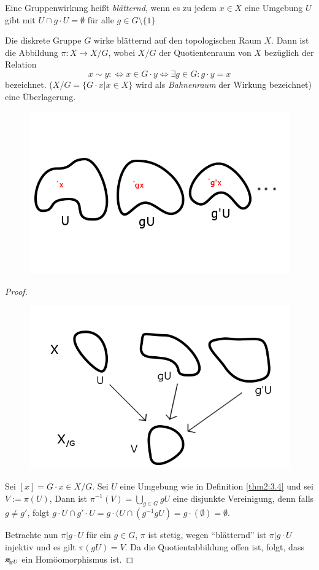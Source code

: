 \documentclass[a4paper,10pt]{scrartcl}
\begin{document}
\begin{df}\label{thm2:3.4}
 Eine Gruppenwirkung heißt \emph{blätternd}, wenn es zu jedem $x\in X$ eine Umgebung $U$ gibt mit $U\cap g\cdot U=\emptyset$ für alle $g\in G\setminus\{1\}$
\end{df}
\begin{lem}
 Die diskrete Gruppe $G$ wirke blätternd auf den topologischen Raum $X$. Dann ist die Abbildung $\pi: X\to X/G$, wobei $X/G$ der Quotientenraum von $X$ bezüglich der Relation
\[
 x\sim y :\iff x\in G\cdot y \iff \exists g\in G: g\cdot y=x
\]
bezeichnet. ($X/G=\{G\cdot x|x\in X\}$ wird als \emph{Bahnenraum} der Wirkung bezeichnet) eine Überlagerung.
\begin{figure}[H]
\centering
\includegraphics[scale=0.3]{fig75.png} 
\end{figure}

\end{lem}
\begin{proof}
\begin{figure}[H]
\centering
\includegraphics[scale=0.3]{fig76.png} 
\end{figure}
 Sei $[x]=G\cdot x\in X/G$. Sei $U$ eine Umgebung wie in Definition \ref{thm2:3.4} und sei $V:=\pi(U)$, Dann ist $\pi^{-1}(V)=\bigcup_{g\in G} gU$ eine disjunkte Vereinigung, denn falls $g\neq g'$, folgt $g\cdot U \cap g'\cdot U=g\cdot (U\cap(g^{-1}g U)=g\cdot(\emptyset)=\emptyset$.

Betrachte nun $\pi|g\cdot U$ für ein $g\in G$, $\pi$ ist stetig, wegen "`blätternd"' ist $\pi|g\cdot U$ injektiv und es gilt $\pi(gU)=V$.
Da die Quotientabbildung offen ist, folgt, dass $\pi\vline_{gU}$ ein Homöomorphismus ist.
\end{proof}
\end{document}
